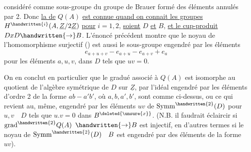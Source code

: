 considéré comme sous-groupe du groupe de Brauer formé des éléments annulés par 2. Donc \uline{la  de} $Q(A)$ \uline{est connue quand on connait les groupes} $H^{\handwritten{i}}(A,\underline{Z}/2\underline{Z})$ \uline{pour} $i=1,2$, \uline{soient} $D$ \uline{et} $B$, \uline{et le cup-produit} $DxD\handwritten{\to}B$. L'énoncé précédent montre  que le noyau de l'homomorphisme surjectif (\handwritten{*}) est aussi le sous-groupe engendré par les éléments
\[
e_{a+u+v}-e_{a+u}-e_{a+v}+e_a
\]
pour les éléments $a,u,v$, dans $D$ tels que $uv=0$.

On en conclut en particulier que le gradué associé à $Q(A)$ est isomorphe au quotient de l'algèbre symétrique de $D$ sur $\underline{Z}$, par  l'idéal engendré par les éléments d'ordre 2 de la forme $ab-a'b'$, où $a,b,a',b'$, sont comme ci-dessus, ou ce qui revient au, même, engendré par les éléments $uv$ de $\mathrm{Symm}^{\handwritten{2}}(D)$ pour $u,v\quad D$ tels que $u.v=0$ dans $B^{\deleted{\unsure{x}}}$. (N.B. il faudrait éclaircir si $\mathrm{grad}^{\handwritten{2}}Q(A)$  $\handwritten{\to}B$ est  injectif, en d'autres termes si le noyau de $\mathrm{Symm}^{\handwritten{2}}(D)\quad B$ est engendré par des éléments de la forme  $uv$).


